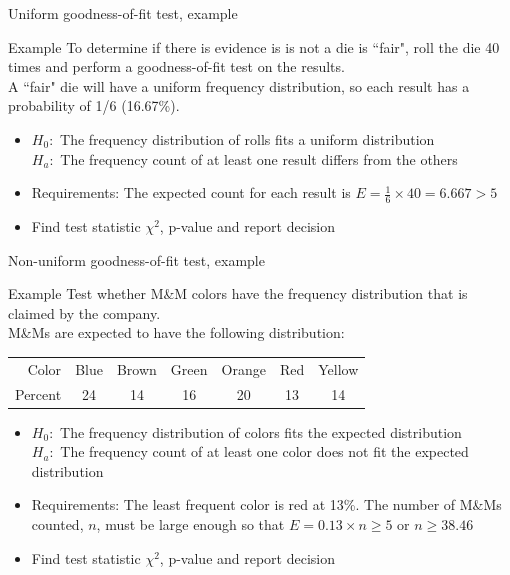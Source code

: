 \documentclass[xcolor=table, handout]{beamer}
\begin{document}
\begin{frame}{Uniform goodness-of-fit test, example}
\begin{exampleblock}{Example}
To determine if there is evidence is is not a die is ``fair", roll the die 40 times and perform a goodness-of-fit test on the results. \\
\medskip
A ``fair" die will have a uniform frequency distribution, so each result has a probability of 1/6 (16.67\%).
\medskip
\begin{itemize}
\pause\item $H_0:$ The frequency distribution of rolls fits a uniform distribution\\
$H_a:$ The frequency count of at least one result differs from the others

\pause\item Requirements: The expected count for each result is $E = \frac 1 6 \times 40 = 6.667 > 5$
\pause\item Find test statistic $\chi^2$, p-value and report decision
\end{itemize}
\end{exampleblock}
\end{frame}

\begin{frame}{Non-uniform goodness-of-fit test, example}
\begin{exampleblock}{Example}
Test whether M\&M colors have the frequency distribution that is claimed by the company.\\
\medskip
M\&Ms are expected to have the following distribution:\\
\smallskip
{\centering
\begin{tabular}{r | c c c c c c }
Color & Blue & Brown & Green & Orange & Red & Yellow\\
Percent & 24 & 14 & 16 & 20 & 13 & 14 
\end{tabular}
\par} 
\medskip

\begin{itemize}
\pause\item $H_0:$ The frequency distribution of colors fits the expected distribution\\
$H_a:$ The frequency count of at least one color does not fit the expected distribution\\
\pause\item Requirements: The least frequent color is red at 13\%. The number of M\&Ms counted, $n$, must be large enough so that $E = 0.13 \times n \ge 5$ or $n \ge 38.46$
\pause\item Find test statistic $\chi^2$, p-value and report decision
\end{itemize}
\end{exampleblock}
\end{frame}
\end{document}
